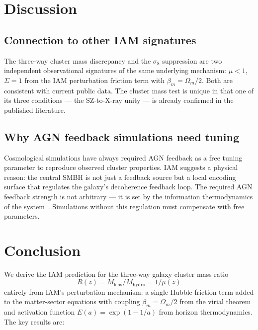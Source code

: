 \documentclass[12pt,a4paper]{article}
\begin{document}
\section{Discussion}

\subsection{Connection to other IAM signatures}

The three-way cluster mass discrepancy and the $\sigma_8$ suppression are two
independent observational signatures of the same underlying mechanism: $\mu < 1$,
$\Sigma = 1$ from the IAM perturbation friction term with $\beta_m = \Omega_m/2$.
Both are consistent with current public data. The cluster mass test is unique in
that one of its three conditions --- the SZ-to-X-ray unity --- is already confirmed
in the published literature.

\subsection{Why AGN feedback simulations need tuning}

Cosmological simulations have always required AGN feedback as a free tuning
parameter to reproduce observed cluster properties. IAM suggests a physical reason:
the central SMBH is not just a feedback source but a local encoding surface that
regulates the galaxy's decoherence feedback loop. The required AGN feedback strength
is not arbitrary --- it is set by the information thermodynamics of the
system~\citep{Mahaffey2026c}. Simulations without this regulation must compensate
with free parameters.

\section{Conclusion}

We derive the IAM prediction for the three-way galaxy cluster mass ratio
\begin{equation*}
R(z) = M_\mathrm{lens}/M_\mathrm{hydro} = 1/\mu(z)
\end{equation*}
entirely from IAM's perturbation mechanism: a single Hubble friction term added to the matter-sector
equations with coupling $\beta_m = \Omega_m/2$ from the virial theorem and
activation function $E(a) = \exp(1 - 1/a)$ from horizon thermodynamics. The key
results are:
\end{document}
